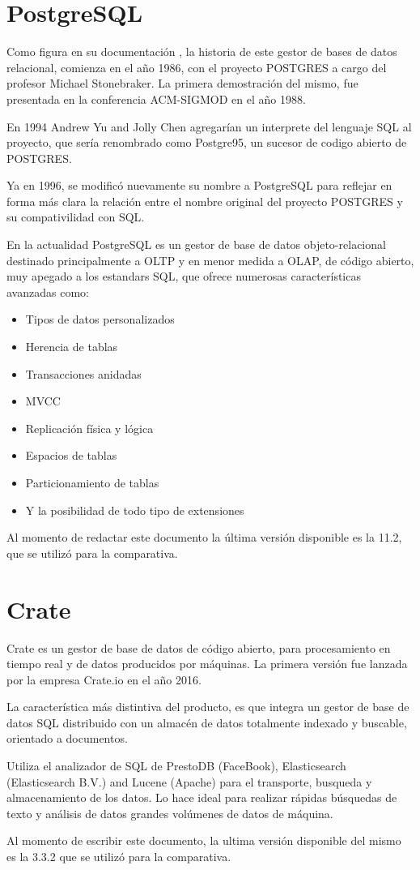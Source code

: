\documentclass[11pt, twocolumns]{article}
\begin{document}
\begin{multicols}{2}
\section{PostgreSQL}
Como figura en su documentación \cite{postgresql}, la historia de este gestor de bases de datos relacional, comienza en el año 1986, con el proyecto POSTGRES a cargo del profesor Michael Stonebraker. La primera demostración del mismo, fue presentada en la conferencia ACM-SIGMOD en el año 1988.
\par
En 1994 Andrew Yu and Jolly Chen agregarían un interprete del lenguaje SQL al proyecto, que sería renombrado como Postgre95, un sucesor de codigo abierto de POSTGRES.
\par
Ya en 1996, se modificó nuevamente su nombre a PostgreSQL para reflejar en forma más clara la relación entre el nombre original del proyecto POSTGRES y su compativilidad con SQL.
\par
En la actualidad PostgreSQL es un gestor de base de datos objeto-relacional destinado principalmente a OLTP y en menor medida a OLAP, de código abierto, muy apegado a los estandars SQL, que ofrece numerosas características avanzadas como:
\begin{itemize}
  \item Tipos de datos personalizados
	\item Herencia de tablas
  \item Transacciones anidadas
	\item MVCC
  \item Replicación física y lógica
	\item Espacios de tablas
	\item Particionamiento de tablas
	\item Y la posibilidad de todo tipo de extensiones
\end{itemize}
\par
Al momento de redactar este documento la última versión disponible es la 11.2, que se utilizó para la comparativa.


\section{Crate}
Crate es un gestor de base de datos de código abierto, para procesamiento en tiempo real y de datos producidos por máquinas. La primera versión fue lanzada por la empresa Crate.io en el año 2016.
\par
La característica más distintiva del producto, es que integra un gestor de base de datos SQL distribuido con un almacén de datos totalmente indexado y buscable, orientado a documentos.
\par
Utiliza el analizador de SQL de PrestoDB (FaceBook), Elasticsearch (Elasticsearch B.V.) and Lucene (Apache) para el transporte, busqueda y almacenamiento de los datos. Lo hace ideal para realizar rápidas búsquedas de texto y análisis de datos grandes volúmenes de datos de máquina.
\par
Al momento de escribir este documento, la ultima versión disponible del mismo es la 3.3.2 que se utilizó para la comparativa.



\end{multicols}
\end{document}
